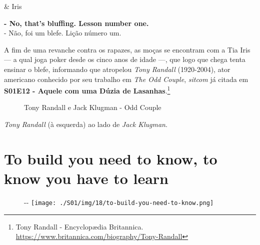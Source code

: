 \begin{tcolorbox}[enhanced,center upper,
    drop fuzzy shadow southeast, boxrule=0.3pt,
    lower separated=false, breakable,
    colframe=black!30!dialogoBorder,colback=white]
\medskip
\begin{minipage}[c]{0.16\linewidth}
   & \centering \scriptsize{Iris}
\end{minipage}
\hfill
\begin{minipage}[c]{0.8\linewidth}
  \textbf{- No, that's bluffing. Lesson number one.}\\
  - Não, foi um blefe. Lição número um.
\end{minipage}
\end{tcolorbox}

A fim de uma revanche contra os rapazes, as moças se encontram com a Tia
Iris --- a qual joga poker desde os cinco anos de idade ---, que logo
que chega tenta ensinar o blefe, informando que atropelou \emph{Tony
Randall} (1920-2004), ator americano conhecido por seu trabalho em
\emph{The Odd Couple}, \emph{sitcom} já citada em
\textbf{\textcolor{primarycolor}{S01E12 - Aquele com uma Dúzia de Lasanhas}}.\footnote{\sloppy Tony Randall - Encyclopædia Britannica. \url{https://www.britannica.com/biography/Tony-Randall}}

\begin{figure}
  \centering
    \caption{Tony Randall e Jack Klugman - Odd Couple\label{fig:tony-randall-e-jack-klugman-odd-couple}}
\end{figure}

\emph{Tony Randall} (à esquerda) ao lado de \emph{Jack Klugman}.

\hypertarget{to-build-you-need-to-know-to-know-you-have-to-learn}{%
\section{To build you need to know, to know you have to
learn}\label{to-build-you-need-to-know-to-know-you-have-to-learn}}

\begin{figure}[!ht]
  \begin{adjustwidth}{-\oddsidemargin-1in}{-\rightmargin}
    \centering
    \texttt{[image: ./S01/img/18/to-build-you-need-to-know.png]}
  \end{adjustwidth}
\end{figure}

